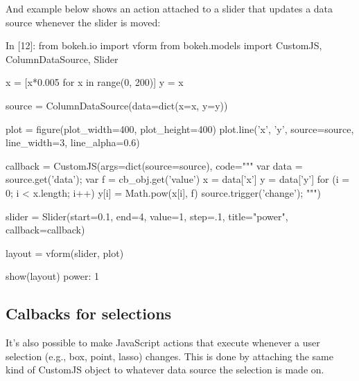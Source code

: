 \documentclass[a4paper,12pt]{article}
\begin{document}
And example below shows an action attached to a slider that updates a data source whenever the slider is moved:

In [12]:
from bokeh.io import vform
from bokeh.models import CustomJS, ColumnDataSource, Slider

x = [x*0.005 for x in range(0, 200)]
y = x

source = ColumnDataSource(data=dict(x=x, y=y))

plot = figure(plot_width=400, plot_height=400)
plot.line('x', 'y', source=source, line_width=3, line_alpha=0.6)

callback = CustomJS(args=dict(source=source), code="""
    var data = source.get('data');
    var f = cb_obj.get('value')
    x = data['x']
    y = data['y']
    for (i = 0; i < x.length; i++) {
        y[i] = Math.pow(x[i], f)
    }
    source.trigger('change');
""")

slider = Slider(start=0.1, end=4, value=1, step=.1, title="power", callback=callback)

layout = vform(slider, plot)

show(layout)
power:  
1
 	

\subsection{Calbacks for selections}
It's also possible to make JavaScript actions that execute whenever a user selection (e.g., box, point, lasso) changes. This is done by attaching the same kind of CustomJS object to whatever data source the selection is made on.
\end{document}
